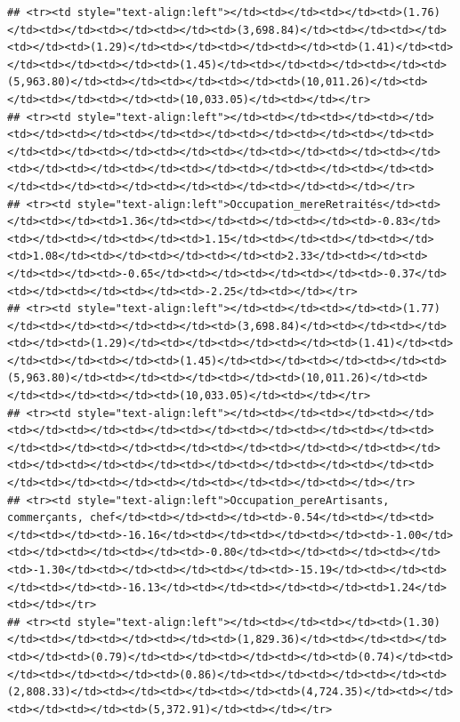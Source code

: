 \documentclass[
]{article}
\begin{document}
\begin{verbatim}
## <tr><td style="text-align:left"></td><td></td><td></td><td>(1.76)</td><td></td><td></td><td></td><td>(3,698.84)</td><td></td><td></td><td></td><td>(1.29)</td><td></td><td></td><td></td><td>(1.41)</td><td></td><td></td><td></td><td>(1.45)</td><td></td><td></td><td></td><td>(5,963.80)</td><td></td><td></td><td></td><td>(10,011.26)</td><td></td><td></td><td></td><td>(10,033.05)</td><td></td></tr>
## <tr><td style="text-align:left"></td><td></td><td></td><td></td><td></td><td></td><td></td><td></td><td></td><td></td><td></td><td></td><td></td><td></td><td></td><td></td><td></td><td></td><td></td><td></td><td></td><td></td><td></td><td></td><td></td><td></td><td></td><td></td><td></td><td></td><td></td><td></td><td></td></tr>
## <tr><td style="text-align:left">Occupation_mereRetraités</td><td></td><td></td><td>1.36</td><td></td><td></td><td></td><td>-0.83</td><td></td><td></td><td></td><td>1.15</td><td></td><td></td><td></td><td>1.08</td><td></td><td></td><td></td><td>2.33</td><td></td><td></td><td></td><td>-0.65</td><td></td><td></td><td></td><td>-0.37</td><td></td><td></td><td></td><td>-2.25</td><td></td></tr>
## <tr><td style="text-align:left"></td><td></td><td></td><td>(1.77)</td><td></td><td></td><td></td><td>(3,698.84)</td><td></td><td></td><td></td><td>(1.29)</td><td></td><td></td><td></td><td>(1.41)</td><td></td><td></td><td></td><td>(1.45)</td><td></td><td></td><td></td><td>(5,963.80)</td><td></td><td></td><td></td><td>(10,011.26)</td><td></td><td></td><td></td><td>(10,033.05)</td><td></td></tr>
## <tr><td style="text-align:left"></td><td></td><td></td><td></td><td></td><td></td><td></td><td></td><td></td><td></td><td></td><td></td><td></td><td></td><td></td><td></td><td></td><td></td><td></td><td></td><td></td><td></td><td></td><td></td><td></td><td></td><td></td><td></td><td></td><td></td><td></td><td></td><td></td></tr>
## <tr><td style="text-align:left">Occupation_pereArtisants, commerçants, chef</td><td></td><td></td><td>-0.54</td><td></td><td></td><td></td><td>-16.16</td><td></td><td></td><td></td><td>-1.00</td><td></td><td></td><td></td><td>-0.80</td><td></td><td></td><td></td><td>-1.30</td><td></td><td></td><td></td><td>-15.19</td><td></td><td></td><td></td><td>-16.13</td><td></td><td></td><td></td><td>1.24</td><td></td></tr>
## <tr><td style="text-align:left"></td><td></td><td></td><td>(1.30)</td><td></td><td></td><td></td><td>(1,829.36)</td><td></td><td></td><td></td><td>(0.79)</td><td></td><td></td><td></td><td>(0.74)</td><td></td><td></td><td></td><td>(0.86)</td><td></td><td></td><td></td><td>(2,808.33)</td><td></td><td></td><td></td><td>(4,724.35)</td><td></td><td></td><td></td><td>(5,372.91)</td><td></td></tr>

\end{verbatim}
\end{document}
